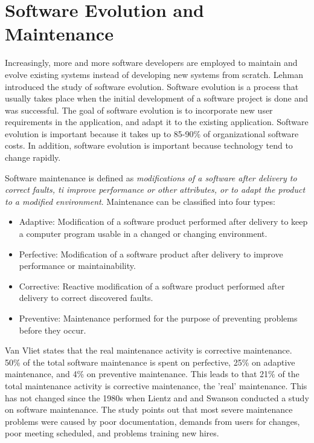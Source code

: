 

\section{Software Evolution and Maintenance}
Increasingly, more and more software developers are employed to maintain and evolve existing systems instead of developing new systems from scratch\cite{Sommerville:2011:SE}. Lehman\cite{lehman1980programs} introduced the study of software evolution. Software evolution is a process that usually takes place when the initial development of a software project is done and was successful\cite{Bennett:2000:SME:336512.336534}. The goal of software evolution is to incorporate new user requirements in the application, and adapt it to the existing application. Software evolution is important because it takes up to 85-90\% of organizational software costs\cite{Sommerville:2011:SE}. In addition, software evolution is important because technology tend to change rapidly.

Software maintenance is defined as \textit{modifications of a software after delivery to correct faults, ti improve performance or other attributes, or to adapt the product to a modified environment}\cite{720567}. Maintenance can be classified into four types\cite{Bennett:2000:SME:336512.336534,720567}:

\begin{itemize}
	\item Adaptive: Modification of a software product performed after delivery to keep a computer program usable in a changed or changing environment.
	\item Perfective: Modification of a software product after delivery to improve performance or maintainability.
	\item Corrective: Reactive modification of a software product performed after delivery to correct discovered faults.
	\item Preventive: Maintenance performed for the purpose of preventing problems before they occur.
\end{itemize}

Van Vliet\cite{Vliet:2008:SEP:1481475} states that the real maintenance activity is corrective maintenance. 50\% of the total software maintenance is spent on perfective, 25\% on adaptive maintenance, and 4\% on preventive maintenance. This leads to that 21\% of the total maintenance activity is corrective maintenance, the 'real' maintenance\cite{Vliet:2008:SEP:1481475}. This has not changed since the 1980s when Lientz and and Swanson conducted a study on software maintenance\cite{lientz1980software}. The study points out that most severe maintenance problems were caused by poor documentation, demands from users for changes, poor meeting scheduled, and problems training new hires.




